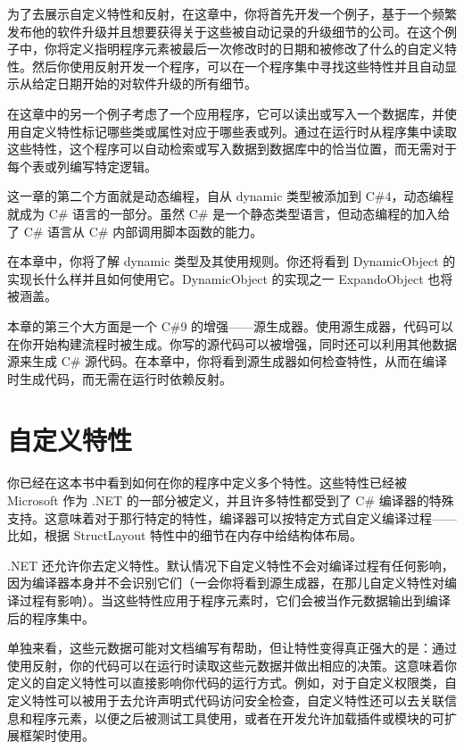 为了去展示自定义特性和反射，在这章中，你将首先开发一个例子，基于一个频繁发布他的软件升级并且想要获得关于这些被自动记录的升级细节的公司。在这个例子中，你将定义指明程序元素被最后一次修改时的日期和被修改了什么的自定义特性。然后你使用反射开发一个程序，可以在一个程序集中寻找这些特性并且自动显示从给定日期开始的对软件升级的所有细节。

在这章中的另一个例子考虑了一个应用程序，它可以读出或写入一个数据库，并使用自定义特性标记哪些类或属性对应于哪些表或列。通过在运行时从程序集中读取这些特性，这个程序可以自动检索或写入数据到数据库中的恰当位置，而无需对于每个表或列编写特定逻辑。

这一章的第二个方面就是动态编程，自从 dynamic 类型被添加到 C\#4，动态编程就成为 C\# 语言的一部分。虽然 C\# 是一个静态类型语言，但动态编程的加入给了 C\# 语言从 C\# 内部调用脚本函数的能力。

在本章中，你将了解 dynamic 类型及其使用规则。你还将看到 DynamicObject 的实现长什么样并且如何使用它。DynamicObject 的实现之一 ExpandoObject 也将被涵盖。

本章的第三个大方面是一个 C\#9 的增强——源生成器。使用源生成器，代码可以在你开始构建流程时被生成。你写的源代码可以被增强，同时还可以利用其他数据源来生成 C\# 源代码。在本章中，你将看到源生成器如何检查特性，从而在编译时生成代码，而无需在运行时依赖反射。

\section{自定义特性}
你已经在这本书中看到如何在你的程序中定义多个特性。这些特性已经被 Microsoft 作为 .NET 的一部分被定义，并且许多特性都受到了 C\# 编译器的特殊支持。这意味着对于那行特定的特性，编译器可以按特定方式自定义编译过程——比如，根据 StructLayout 特性中的细节在内存中给结构体布局。

.NET 还允许你去定义特性。默认情况下自定义特性不会对编译过程有任何影响，因为编译器本身并不会识别它们（一会你将看到源生成器，在那儿自定义特性对编译过程有影响）。当这些特性应用于程序元素时，它们会被当作元数据输出到编译后的程序集中。

单独来看，这些元数据可能对文档编写有帮助，但让特性变得真正强大的是：通过使用反射，你的代码可以在运行时读取这些元数据并做出相应的决策。这意味着你定义的自定义特性可以直接影响你代码的运行方式。例如，对于自定义权限类，自定义特性可以被用于去允许声明式代码访问安全检查，自定义特性还可以去关联信息和程序元素，以便之后被测试工具使用，或者在开发允许加载插件或模块的可扩展框架时使用。

